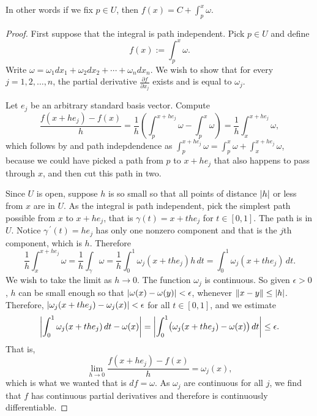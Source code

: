 In other words if we fix $p \in U$, then $f(x) = C + \int_{p}^x \omega$.

\begin{proof}
First suppose that the integral is path independent.  Pick $p \in U$
and define
\begin{equation*}
f(x) := \int_{p}^x \omega .
\end{equation*}
Write $\omega = \omega_1 dx_1 + \omega_2 dx_2 + \cdots + \omega_n dx_n$.
We wish to show that for every $j = 1,2,\ldots,n$, the
partial derivative $\frac{\partial f}{\partial x_j}$ exists
and is equal to $\omega_j$.

Let $e_j$ be an arbitrary standard basis vector.  Compute
\begin{equation*}
\frac{f(x+h e_j) - f(x)}{h} =
\frac{1}{h} \left( \int_{p}^{x+he_j} \omega - \int_{p}^x \omega \right)
=
\frac{1}{h} \int_{x}^{x+he_j} \omega ,
\end{equation*}
which follows by  and path indepdendence as 
$\int_{p}^{x+he_j} \omega =
\int_{p}^{x} \omega +
\int_{x}^{x+he_j} \omega$, because we could have picked a path from $p$ to
$x+he_j$ that also happens to pass through $x$, and then cut this path in
two.


Since $U$ is open, suppose $h$ is so small so that all points of distance
$\left\lvert {h} \right\rvert$ or
less from $x$ are in $U$.
As the integral is path independent,
pick the simplest path possible from $x$ to $x+he_j$, that is
$\gamma(t) = x+t he_j$ for $t \in [0,1]$.  The path is in $U$.
Notice $\gamma^{\:\prime}(t) = h e_j$
has only one nonzero component and that is the $j$th component, which is
$h$.  Therefore
\begin{equation*}
\frac{1}{h} \int_{x}^{x+he_j} \omega 
=
\frac{1}{h} \int_{\gamma} \omega 
=
\frac{1}{h} \int_0^1 \omega_j(x+the_j) h \, dt 
=
\int_0^1 \omega_j(x+the_j) \, dt  .
\end{equation*}
We wish to take the limit as $h \to 0$.  The function $\omega_j$ is
continuous.  So given $\epsilon > 0$, $h$ can be small enough so that
$\left\lvert {\omega(x)-\omega(y)} \right\rvert < \epsilon$, whenever $\lVert {x-y} \rVert \leq \left\lvert {h} \right\rvert$.
Therefore,
$\left\lvert {\omega_j(x+the_j)-\omega_j(x)} \right\rvert < \epsilon$ for all $t \in [0,1]$,
and we estimate
\begin{equation*}
\left\lvert {\int_0^1 \omega_j(x+the_j) \, dt  - \omega(x)} \right\rvert
=
\left\lvert {\int_0^1 \bigl( \omega_j(x+the_j) - \omega(x) \bigr) \, dt} \right\rvert
\leq
\epsilon .
\end{equation*}
That is,
\begin{equation*}
\lim_{h\to 0}\frac{f(x+h e_j) - f(x)}{h} = \omega_j(x) ,
\end{equation*}
which is what we wanted that is $df = \omega$.  As $\omega_j$ are
continuous for all $j$, we find that $f$ has continuous partial derivatives and
therefore is continuously differentiable.


\end{proof}
